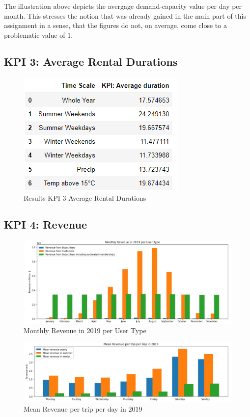 The illustration above depicts the avergage demand-capacity value per day per month. This stresses the notion that was already gained in the main part of this assignment in a sense, that the figures do not, on average, come close to a problematic value of 1.


\subsection{KPI 3: Average Rental Durations}
\label{app:A5}

\begin{figure}[H]
   \centering
    \includegraphics[width=0.4\linewidth]{./Figures/Duration_Fig_2.png}
    \caption{Results KPI 3 Average Rental Durations}
    \label{Duration_Fig_2}
\end{figure}

\subsection{KPI 4: Revenue}
\label{app:A6}

\begin{figure}[H]
    \centering
    \includegraphics[width=0.9\linewidth]{./Figures/Revenue_monthlyUserType.jpeg}
    \caption{Monthly Revenue in 2019 per User Type}
    \label{fig_revenue_2}
\end{figure}

\begin{figure}[H]
    \centering
    \includegraphics[width=0.9\linewidth]{./Figures/Revenue_week.jpeg}
    \caption{Mean Revenue per trip per day in 2019}
    \label{fig_revenue_3}
\end{figure}

